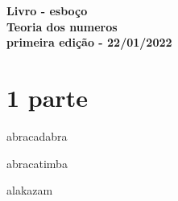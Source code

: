\documentclass{book}
\begin{document}
\Large \textbf{Livro - esboço}
\normalsize
\\ \textbf{Teoria dos numeros}
\\ \textbf{primeira edição - 22/01/2022}





\tableofcontents 
\clearpage





\chapter{1 parte}

abracadabra

abracatimba

alakazam
\end{document}

